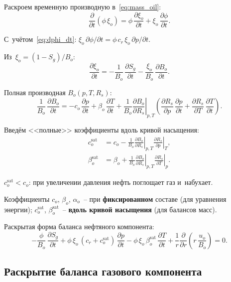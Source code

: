 \documentclass[12pt,a4paper]{article}
\newcommand{\divr}[1]{\frac{1}{r}\frac{\partial}{\partial r}\!\left(r\,#1\right)}
\newcommand{\pdt}[1]{\frac{\partial #1}{\partial t}}
\newcommand{\csat}{c_o^{\mathrm{sat}}}
\newcommand{\bsat}{\beta_o^{\mathrm{sat}}}
\newcommand{\xio}{\xi_o}
\begin{document}
Раскроем временную производную в~\eqref{eq:mass_oil}:
\begin{equation}\label{eq:oil_dt_step1}
  \pdt{}\!\left(\phi\,\xio\right)
  = \phi\,\pdt{\xio}
    + \xio\,\pdt{\phi}.
\end{equation}

С~учётом~\eqref{eq:dphi_dt}:
$\xio\,\partial\phi/\partial t = \phi\,c_r\,\xio\,\partial p/\partial t$.

Из~$\xio = (1 - S_g)/B_o$:
\begin{equation}\label{eq:dxi_dt}
  \pdt{\xio}
  = -\frac{1}{B_o}\,\pdt{S_g}
    - \frac{\xio}{B_o}\,\pdt{B_o}.
\end{equation}

Полная производная $B_o(p,T,R_s)$:
\begin{equation}\label{eq:dBo_dt}
  \frac{1}{B_o}\,\pdt{B_o}
  = -c_o\,\pdt{p}
    + \beta_o\,\pdt{T}
    + \frac{1}{B_o}\left.\frac{\partial B_o}{\partial R_s}\right|_{p,T}
      \!\left(
        \frac{\partial R_s}{\partial p}\,\pdt{p}
        + \frac{\partial R_s}{\partial T}\,\pdt{T}
      \right).
\end{equation}

Введём <<полные>> коэффициенты вдоль кривой насыщения:
\begin{align}
  \csat &= c_o
    - \frac{1}{B_o}\left.\frac{\partial B_o}{\partial R_s}\right|_{p,T}
      \left.\frac{\partial R_s}{\partial p}\right|_T,
      \label{eq:co_sat} \\[4pt]
  \bsat &= \beta_o
    + \frac{1}{B_o}\left.\frac{\partial B_o}{\partial R_s}\right|_{p,T}
      \left.\frac{\partial R_s}{\partial T}\right|_p.
      \label{eq:beta_o_sat}
\end{align}

$\csat < c_o$: при увеличении давления нефть поглощает газ и~набухает.

Коэффициенты $c_o$, $\beta_o$, $\alpha_o$~-- при \textbf{фиксированном}
составе (для уравнения энергии); $\csat$, $\bsat$~-- \textbf{вдоль
кривой насыщения} (для балансов масс).

Раскрытая форма баланса нефтяного компонента:
\begin{equation}\label{eq:mass_oil_expanded}
  -\frac{\phi}{B_o}\,\pdt{S_g}
  + \phi\,\xio\,(c_r + \csat)\,\pdt{p}
  - \phi\,\xio\,\bsat\,\pdt{T}
  + \divr{\frac{u_o}{B_o}} = 0.
\end{equation}


\subsection{Раскрытие баланса газового компонента}
\end{document}

